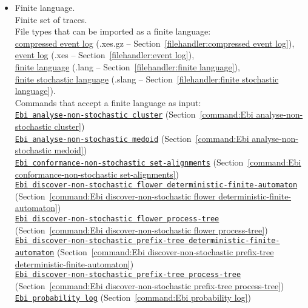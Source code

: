 {\begin{itemize}
\item Finite language.
\\Finite set of traces.
\\File types that can be imported as a finite language: \\\null\qquad\hyperref[filehandler:compressed event log]{compressed event log} (.xes.gz -- Section~\ref{filehandler:compressed event log}), \\\null\qquad\hyperref[filehandler:event log]{event log} (.xes -- Section~\ref{filehandler:event log}), \\\null\qquad\hyperref[filehandler:finite language]{finite language} (.lang -- Section~\ref{filehandler:finite language}), \\\null\qquad\hyperref[filehandler:finite stochastic language]{finite stochastic language} (.slang -- Section~\ref{filehandler:finite stochastic language}).
\\Commands that accept a finite language as input: \\\null\qquad\hyperref[command:Ebi analyse-non-stochastic cluster]{\texttt{Ebi analyse-non-stochastic cluster}} (Section~\ref{command:Ebi analyse-non-stochastic cluster})\\\null\qquad\hyperref[command:Ebi analyse-non-stochastic medoid]{\texttt{Ebi analyse-non-stochastic medoid}} (Section~\ref{command:Ebi analyse-non-stochastic medoid})\\\null\qquad\hyperref[command:Ebi conformance-non-stochastic set-alignments]{\texttt{Ebi conformance-non-stochastic set-alignments}} (Section~\ref{command:Ebi conformance-non-stochastic set-alignments})\\\null\qquad\hyperref[command:Ebi discover-non-stochastic flower deterministic-finite-automaton]{\texttt{Ebi discover-non-stochastic flower deterministic-finite-automaton}} (Section~\ref{command:Ebi discover-non-stochastic flower deterministic-finite-automaton})\\\null\qquad\hyperref[command:Ebi discover-non-stochastic flower process-tree]{\texttt{Ebi discover-non-stochastic flower process-tree}} (Section~\ref{command:Ebi discover-non-stochastic flower process-tree})\\\null\qquad\hyperref[command:Ebi discover-non-stochastic prefix-tree deterministic-finite-automaton]{\texttt{Ebi discover-non-stochastic prefix-tree deterministic-finite-automaton}} (Section~\ref{command:Ebi discover-non-stochastic prefix-tree deterministic-finite-automaton})\\\null\qquad\hyperref[command:Ebi discover-non-stochastic prefix-tree process-tree]{\texttt{Ebi discover-non-stochastic prefix-tree process-tree}} (Section~\ref{command:Ebi discover-non-stochastic prefix-tree process-tree})\\\null\qquad\hyperref[command:Ebi probability log]{\texttt{Ebi probability log}} (Section~\ref{command:Ebi probability log})

\end{itemize}}
